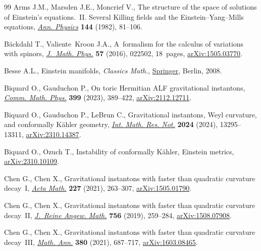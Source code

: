 \begin{thebibliography}{99}
Arms J.M., Marsden J.E., Moncrief V., The structure of the space of solutions
 of {E}instein's equations.~{II}. {S}everal {K}illing fields and the
 {E}instein--{Y}ang--{M}ills equations, \href{https://doi.org/10.1016/0003-4916(82)90105-1}{\textit{Ann. Physics}} \textbf{144}
 (1982), 81--106.

B\"ackdahl T., Valiente~Kroon J.A., A~formalism for the calculus of variations
 with spinors, \href{https://doi.org/10.1063/1.4939562}{\textit{J.~Math. Phys.}} \textbf{57} (2016), 022502, 18~pages,
 \href{https://arxiv.org/abs/1505.03770}{arXiv:1505.03770}.

Besse A.L., Einstein manifolds, \textit{Classics Math.}, \href{https://doi.org/10.1007/978-3-540-74311-8}{Springer}, Berlin, 2008.

Biquard O., Gauduchon P., On toric {H}ermitian {ALF} gravitational instantons,
 \href{https://doi.org/10.1007/s00220-022-04562-z}{\textit{Comm. Math. Phys.}} \textbf{399} (2023), 389--422,
 \href{https://arxiv.org/abs/2112.12711}{arXiv:2112.12711}.

Biquard O., Gauduchon P., LeBrun C., Gravitational instantons, {W}eyl
 curvature, and conformally {K}\"ahler geometry, \href{https://doi.org/10.1093/imrn/rnae200}{\textit{Int. Math. Res. Not.}}
 \textbf{2024} (2024), 13295--13311, \href{https://arxiv.org/abs/2310.14387}{arXiv:2310.14387}.

Biquard O., Ozuch T., Instability of conformally {K}\"ahler, {E}instein
 metrics, \href{https://arxiv.org/abs/2310.10109}{arXiv:2310.10109}.

Chen G., Chen X., Gravitational instantons with faster than quadratic curvature
 decay~{I}, \href{https://doi.org/10.4310/acta.2021.v227.n2.a2}{\textit{Acta Math.}} \textbf{227} (2021), 263--307,
 \href{https://arxiv.org/abs/1505.01790}{arXiv:1505.01790}.

Chen G., Chen X., Gravitational instantons with faster than quadratic curvature
 decay~{II}, \href{https://doi.org/10.1515/crelle-2017-0026}{\textit{J.~Reine Angew. Math.}} \textbf{756} (2019), 259--284,
 \href{https://arxiv.org/abs/1508.07908}{arXiv:1508.07908}.

Chen G., Chen X., Gravitational instantons with faster than quadratic curvature
 decay~{III}, \href{https://doi.org/10.1007/s00208-020-01984-9}{\textit{Math. Ann.}} \textbf{380} (2021), 687--717,
 \href{https://arxiv.org/abs/1603.08465}{arXiv:1603.08465}.


\end{thebibliography}
